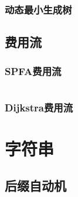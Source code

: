 \documentclass[a4paper, twoside]{article}
\begin{document}
\begin{multicols}{2}
				\subsubsection{动态最小生成树}
					
			
			\subsection{费用流}
				\subsubsection{SPFA费用流}
					\inputminted{cpp}{../src/graph/SPFA费用流.cpp}

				\subsubsection{Dijkstra费用流}
					




		\newpage
		\section{字符串}

			\subsection{后缀自动机}
				\inputminted{cpp}{../src-midori/string/后缀自动机.cpp}

	\end{multicols}

	
\end{document}

